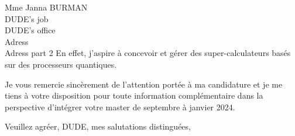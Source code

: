 \documentclass[12pt]{letter} %
\begin{document}
\begin{letter}{
        Mme Janna BURMAN \\
        DUDE's job \\
        DUDE's office \\
        Adress \\
        Adress part 2
    }
        En effet, j'aspire à concevoir et gérer des super-calculateurs basés sur des processeurs quantiques.

        Je vous remercie sincèrement de l'attention portée à ma candidature et
        je me tiens à votre disposition pour toute information complémentaire dans la perspective
        d'intégrer votre master de septembre à janvier 2024.

        \closing{Veuillez agréer, DUDE, mes salutations distinguées,}




    \end{letter}
\end{document}
